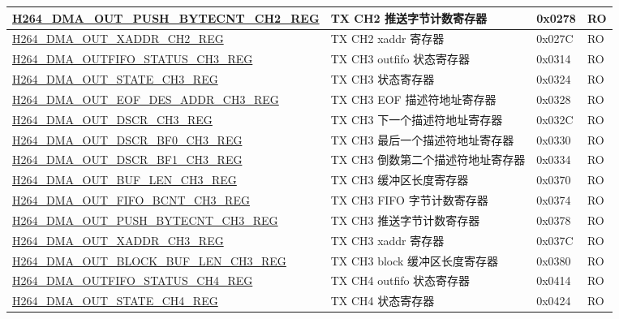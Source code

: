 \begin{longtable}{ | p{7.5cm} | p{5.7cm} | p{1.2cm} | p{1.5cm} | }
    \hyperref[regdesc:H264DMAOUTPUSHBYTECNTCH2REG]{H264\_DMA\_OUT\_PUSH\_BYTECNT\_CH2\_REG} & TX CH2 推送字节计数寄存器 & 0x0278 & RO \\ \hline
    \hyperref[regdesc:H264DMAOUTXADDRCH2REG]{H264\_DMA\_OUT\_XADDR\_CH2\_REG} & TX CH2 xaddr 寄存器 & 0x027C & RO \\ \hline
    \hyperref[regdesc:H264DMAOUTFIFOSTATUSCH3REG]{H264\_DMA\_OUTFIFO\_STATUS\_CH3\_REG} & TX CH3 outfifo 状态寄存器 & 0x0314 & RO \\ \hline
    \hyperref[regdesc:H264DMAOUTSTATECH3REG]{H264\_DMA\_OUT\_STATE\_CH3\_REG} & TX CH3 状态寄存器 & 0x0324 & RO \\ \hline
    \hyperref[regdesc:H264DMAOUTEOFDESADDRCH3REG]{H264\_DMA\_OUT\_EOF\_DES\_ADDR\_CH3\_REG} & TX CH3 EOF 描述符地址寄存器 & 0x0328 & RO \\ \hline
    \hyperref[regdesc:H264DMAOUTDSCRCH3REG]{H264\_DMA\_OUT\_DSCR\_CH3\_REG} & TX CH3 下一个描述符地址寄存器 & 0x032C & RO \\ \hline
    \hyperref[regdesc:H264DMAOUTDSCRBF0CH3REG]{H264\_DMA\_OUT\_DSCR\_BF0\_CH3\_REG} & TX CH3 最后一个描述符地址寄存器 & 0x0330 & RO \\ \hline
    \hyperref[regdesc:H264DMAOUTDSCRBF1CH3REG]{H264\_DMA\_OUT\_DSCR\_BF1\_CH3\_REG} & TX CH3 倒数第二个描述符地址寄存器 & 0x0334 & RO \\ \hline
    \hyperref[regdesc:H264DMAOUTBUFLENCH3REG]{H264\_DMA\_OUT\_BUF\_LEN\_CH3\_REG} & TX CH3 缓冲区长度寄存器 & 0x0370 & RO \\ \hline
    \hyperref[regdesc:H264DMAOUTFIFOBCNTCH3REG]{H264\_DMA\_OUT\_FIFO\_BCNT\_CH3\_REG} & TX CH3 FIFO 字节计数寄存器 & 0x0374 & RO \\ \hline
    \hyperref[regdesc:H264DMAOUTPUSHBYTECNTCH3REG]{H264\_DMA\_OUT\_PUSH\_BYTECNT\_CH3\_REG} & TX CH3  推送字节计数寄存器 & 0x0378 & RO \\ \hline
    \hyperref[regdesc:H264DMAOUTXADDRCH3REG]{H264\_DMA\_OUT\_XADDR\_CH3\_REG} & TX CH3 xaddr 寄存器 & 0x037C & RO \\ \hline
    \hyperref[regdesc:H264DMAOUTBLOCKBUFLENCH3REG]{H264\_DMA\_OUT\_BLOCK\_BUF\_LEN\_CH3\_REG} & TX CH3 block 缓冲区长度寄存器 & 0x0380 & RO \\ \hline
    \hyperref[regdesc:H264DMAOUTFIFOSTATUSCH4REG]{H264\_DMA\_OUTFIFO\_STATUS\_CH4\_REG} & TX CH4 outfifo 状态寄存器 & 0x0414 & RO \\ \hline
    \hyperref[regdesc:H264DMAOUTSTATECH4REG]{H264\_DMA\_OUT\_STATE\_CH4\_REG} & TX CH4 状态寄存器 & 0x0424 & RO \\ \hline

\end{longtable}
